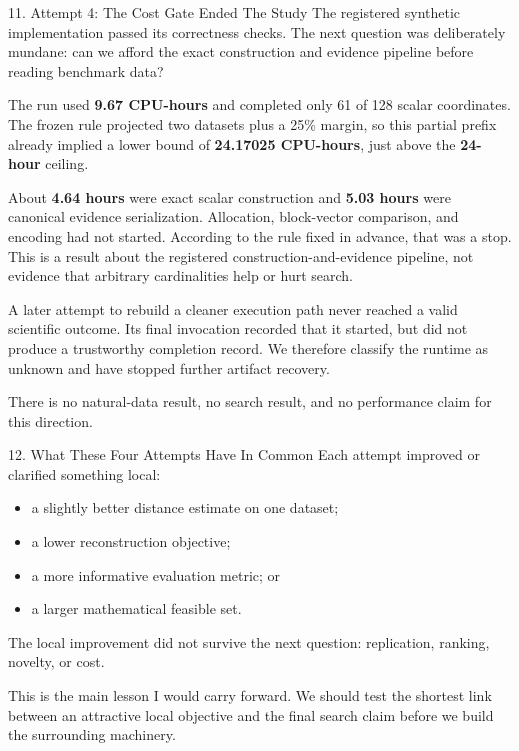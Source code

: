 \documentclass[
  ignorenonframetext,
  aspectratio=169,
]{beamer}
\providecommand{\tightlist}{%
  \setlength{\itemsep}{0pt}\setlength{\parskip}{0pt}}
\begin{document}
\begin{frame}{11. Attempt 4: The Cost Gate Ended The Study}
\protect{}\label{11-attempt-4-the-cost-gate-ended-the-study}
The registered synthetic implementation passed its correctness checks.
The next question was deliberately mundane: can we afford the exact
construction and evidence pipeline before reading benchmark data?

The run used \textbf{9.67 CPU-hours} and completed only 61 of 128 scalar
coordinates. The frozen rule projected two datasets plus a 25\% margin,
so this partial prefix already implied a lower bound of \textbf{24.17025
CPU-hours}, just above the \textbf{24-hour} ceiling.

About \textbf{4.64 hours} were exact scalar construction and \textbf{5.03
hours} were canonical evidence serialization. Allocation, block-vector
comparison, and encoding had not started. According to the rule fixed in
advance, that was a stop. This is a result about the registered
construction-and-evidence pipeline, not evidence that arbitrary
cardinalities help or hurt search.

A later attempt to rebuild a cleaner execution path never reached a
valid scientific outcome. Its final invocation recorded that it started,
but did not produce a trustworthy completion record. We therefore
classify the runtime as unknown and have stopped further artifact
recovery.

There is no natural-data result, no search result, and no performance
claim for this direction.
\end{frame}

\begin{frame}{12. What These Four Attempts Have In Common}
\protect{}\label{12-what-these-four-attempts-have-in-common}
Each attempt improved or clarified something local:

\begin{itemize}
\tightlist
\item
  a slightly better distance estimate on one dataset;
\item
  a lower reconstruction objective;
\item
  a more informative evaluation metric; or
\item
  a larger mathematical feasible set.
\end{itemize}

The local improvement did not survive the next question: replication,
ranking, novelty, or cost.

This is the main lesson I would carry forward. We should test the
shortest link between an attractive local objective and the final search
claim before we build the surrounding machinery.
\end{frame}
\end{document}
